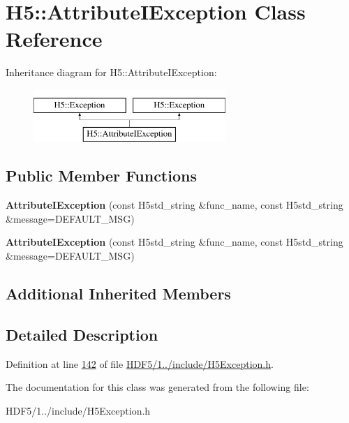 \hypertarget{class_h5_1_1_attribute_i_exception}{}\section{H5\+:\+:Attribute\+I\+Exception Class Reference}
\label{class_h5_1_1_attribute_i_exception}
Inheritance diagram for H5\+:\+:Attribute\+I\+Exception\+:\begin{figure}[H]
\begin{center}
\leavevmode
\includegraphics[height=2.000000cm]{class_h5_1_1_attribute_i_exception}
\end{center}
\end{figure}
\subsection*{Public Member Functions}
\begin{DoxyCompactItemize}
\item 
\mbox{\label{class_h5_1_1_attribute_i_exception_a365a1c8cb64858c5e9b14dd008979958}} 
{\bfseries Attribute\+I\+Exception} (const H5std\+\_\+string \&func\+\_\+name, const H5std\+\_\+string \&message=D\+E\+F\+A\+U\+L\+T\+\_\+\+M\+SG)
\item 
\mbox{\label{class_h5_1_1_attribute_i_exception_a365a1c8cb64858c5e9b14dd008979958}} 
{\bfseries Attribute\+I\+Exception} (const H5std\+\_\+string \&func\+\_\+name, const H5std\+\_\+string \&message=D\+E\+F\+A\+U\+L\+T\+\_\+\+M\+SG)
\end{DoxyCompactItemize}
\subsection*{Additional Inherited Members}


\subsection{Detailed Description}


Definition at line \hyperlink{_h_d_f5_21_810_81_2include_2_h5_exception_8h_source_l00142}{142} of file \hyperlink{_h_d_f5_21_810_81_2include_2_h5_exception_8h_source}{H\+D\+F5/1../include/\+H5\+Exception.\+h}.



The documentation for this class was generated from the following file\+:\begin{DoxyCompactItemize}
\item 
H\+D\+F5/1../include/\+H5\+Exception.\+h\end{DoxyCompactItemize}
